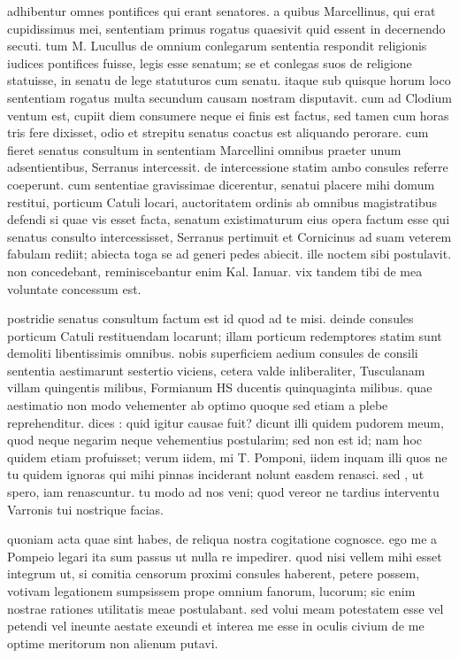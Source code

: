  adhibentur omnes pontifices qui erant senatores. a quibus Marcellinus, qui erat cupidissimus mei, sententiam primus rogatus quaesivit quid essent in decernendo secuti. tum M. Lucullus de omnium conlegarum sententia respondit religionis iudices pontifices fuisse, legis esse senatum; se et conlegas suos de religione statuisse, in senatu de lege statuturos cum senatu. itaque sub quisque horum loco sententiam rogatus multa secundum causam nostram disputavit. cum ad Clodium ventum est, cupiit diem consumere neque ei finis est factus, sed tamen cum horas tris fere dixisset, odio et strepitu senatus coactus est aliquando perorare. cum fieret senatus consultum in sententiam Marcellini omnibus praeter unum adsentientibus, Serranus intercessit. de intercessione statim ambo consules referre coeperunt. cum sententiae gravissimae dicerentur, senatui placere mihi domum restitui, porticum Catuli locari, auctoritatem ordinis ab omnibus magistratibus defendi si quae vis esset facta, senatum existimaturum eius opera factum esse qui senatus consulto intercessisset, Serranus pertimuit et Cornicinus ad suam veterem fabulam rediit; abiecta toga se ad generi pedes abiecit. ille noctem sibi postulavit. non concedebant, reminiscebantur enim Kal. Ianuar. vix tandem tibi de mea voluntate concessum est.

 postridie senatus consultum factum est id quod ad te misi. deinde consules porticum Catuli restituendam locarunt; illam porticum redemptores statim sunt demoliti libentissimis omnibus. nobis superficiem aedium consules de consili sententia aestimarunt sestertio viciens, cetera valde inliberaliter, Tusculanam villam quingentis milibus, Formianum HS ducentis quinquaginta milibus. quae aestimatio non modo vehementer ab optimo quoque sed etiam a plebe reprehenditur. dices : quid igitur causae fuit? dicunt illi quidem pudorem meum, quod neque negarim neque vehementius postularim; sed non est id; nam hoc quidem etiam profuisset; verum iidem, mi T. Pomponi, iidem inquam illi quos ne tu quidem ignoras qui mihi pinnas inciderant nolunt easdem renasci. sed , ut spero, iam renascuntur. tu modo ad nos veni; quod vereor ne tardius interventu Varronis tui nostrique facias.

 quoniam acta quae sint habes, de reliqua nostra cogitatione cognosce. ego me a Pompeio legari ita sum passus ut nulla re impedirer. quod nisi vellem mihi esset integrum ut, si comitia censorum proximi consules haberent, petere possem, votivam legationem sumpsissem prope omnium fanorum, lucorum; sic enim nostrae rationes utilitatis meae postulabant. sed volui meam potestatem esse vel petendi vel ineunte aestate exeundi et interea me esse in oculis civium de me optime meritorum non alienum putavi.

